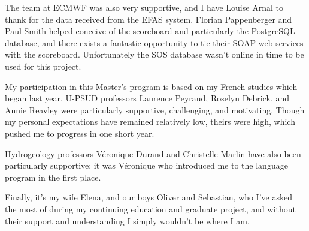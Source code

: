 \documentclass[logos,parttoc,morelanguage=french,morelanguage=italian]{orsay-memoire}
\begin{document}
The team at ECMWF was also very supportive, and I have Louise Arnal to thank for the data received from the EFAS system. Florian Pappenberger and Paul Smith helped conceive of the scoreboard and particularly the PostgreSQL database, and there exists a fantastic opportunity to tie their SOAP web services with the scoreboard. Unfortunately the SOS database wasn't online in time to be used for this project.

My participation in this Master's program is based on my French studies which began last year. U-PSUD professors Laurence Peyraud, Roselyn Debrick, and Annie Reavley were particularly supportive, challenging, and motivating. Though my personal expectations have remained relatively low, theirs were high, which pushed me to progress in one short year.

Hydrogeology professors Véronique Durand and Christelle Marlin have also been particularly supportive; it was Véronique who introduced me to the language program in the first place. 

Finally, it's my wife Elena, and our boys Oliver and Sebastian, who I've asked the most of during my continuing education and graduate project, and without their support and understanding I simply wouldn't be where I am. 

\vfill



\strut\newpage

\tableofcontents

\newpage




\printglossaries


\newpage

\end{document}
